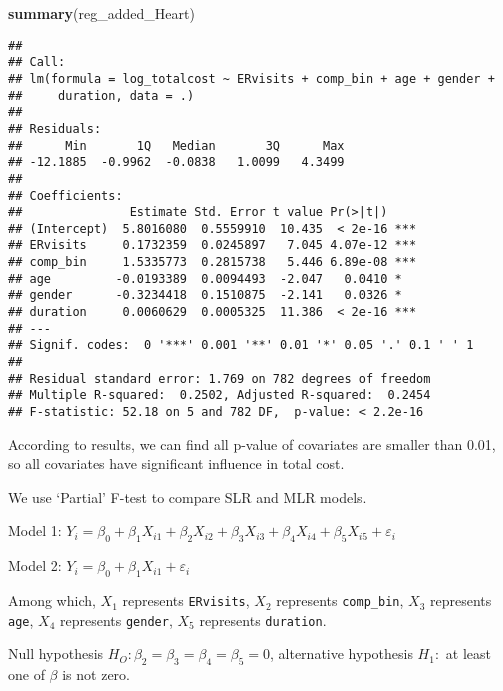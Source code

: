 \documentclass[]{article}
\newenvironment{Shaded}{\begin{snugshade}}{\end{snugshade}}
\newcommand{\KeywordTok}[1]{\textcolor[rgb]{0.13,0.29,0.53}{\textbf{#1}}}
\newcommand{\StringTok}[1]{\textcolor[rgb]{0.31,0.60,0.02}{#1}}
\newcommand{\OperatorTok}[1]{\textcolor[rgb]{0.81,0.36,0.00}{\textbf{#1}}}
\newcommand{\NormalTok}[1]{#1}
\begin{document}
\begin{Shaded}
\begin{Highlighting}[]
\KeywordTok{summary}\NormalTok{(reg_added_Heart)}
\end{Highlighting}
\end{Shaded}

\begin{verbatim}
## 
## Call:
## lm(formula = log_totalcost ~ ERvisits + comp_bin + age + gender + 
##     duration, data = .)
## 
## Residuals:
##      Min       1Q   Median       3Q      Max 
## -12.1885  -0.9962  -0.0838   1.0099   4.3499 
## 
## Coefficients:
##               Estimate Std. Error t value Pr(>|t|)    
## (Intercept)  5.8016080  0.5559910  10.435  < 2e-16 ***
## ERvisits     0.1732359  0.0245897   7.045 4.07e-12 ***
## comp_bin     1.5335773  0.2815738   5.446 6.89e-08 ***
## age         -0.0193389  0.0094493  -2.047   0.0410 *  
## gender      -0.3234418  0.1510875  -2.141   0.0326 *  
## duration     0.0060629  0.0005325  11.386  < 2e-16 ***
## ---
## Signif. codes:  0 '***' 0.001 '**' 0.01 '*' 0.05 '.' 0.1 ' ' 1
## 
## Residual standard error: 1.769 on 782 degrees of freedom
## Multiple R-squared:  0.2502, Adjusted R-squared:  0.2454 
## F-statistic: 52.18 on 5 and 782 DF,  p-value: < 2.2e-16
\end{verbatim}

According to results, we can find all p-value of covariates are smaller
than 0.01, so all covariates have significant influence in total cost.

We use `Partial' F-test to compare SLR and MLR models.

Model 1:
\(Y_i = \beta_0 + \beta_1X_{i1} + \beta_2X_{i2} + \beta_3X_{i3} + \beta_4X_{i4} + \beta_5X_{i5} + \varepsilon_i\)

Model 2: \(Y_i = \beta_0 + \beta_1X_{i1} + \varepsilon_i\)

Among which, \(X_1\) represents \texttt{ERvisits}, \(X_2\) represents
\texttt{comp\_bin}, \(X_3\) represents \texttt{age}, \(X_4\) represents
\texttt{gender}, \(X_5\) represents \texttt{duration}.

Null hypothesis \(H_O: \beta_2 = \beta_3 = \beta_4 = \beta_5 = 0\),
alternative hypothesis \(H_1:\) at least one of \(\beta\) is not zero.

\begin{Shaded}
\end{Shaded}
\end{document}

